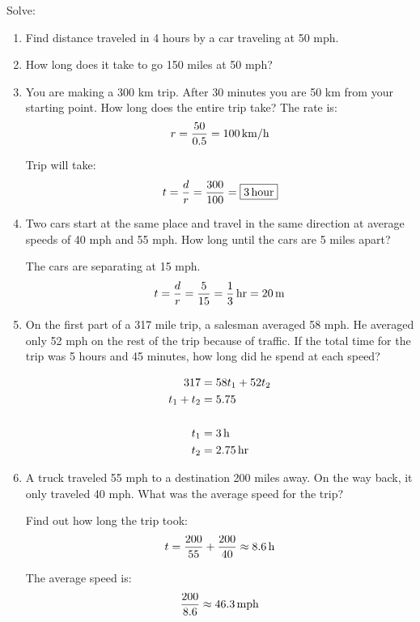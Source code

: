 \documentclass[letterpaper, landscape]{exam}
\begin{document}
  Solve:
  \begin{enumerate}
    \item Find distance traveled in 4 hours by a car traveling at 50 mph.

    \item How long does it take to go 150 miles at 50 mph?

    \item You are making a 300 km trip. After 30 minutes you are 50 km from your starting point. How long does the entire trip take?
      The rate is:
      \[
        r = \frac{50}{0.5} = \unit[100]{km/h}
      \]

      Trip will take:
      \[
        t = \frac{d}{r} = \frac{300}{100} = \boxed{ \unit[3]{hour} } 
      \]

    \item Two cars start at the same place and travel in the same direction at average speeds of 40
      mph and 55 mph. How long until the cars are 5 miles apart?

      The cars are separating at 15 mph.
      \[
        t = \frac{d}{r} = \frac{5}{15} = \unit[\frac{1}{3}]{hr} = \unit[20]{m}
      \]

    \item On the first part of a 317 mile trip, a salesman averaged 58 mph. He averaged only 52 mph
      on the rest of the trip because of traffic. If the total time for the trip was 5 hours and 45
      minutes, how long did he spend at each speed?

      \begin{align*}
        317       & = 58 t_1 + 52 t_2 \\
        t_1 + t_2 & = 5.75 \\
        \\
        t_1       & = \unit[3]{h} \\
        t_2       & = \unit[2.75]{hr}
      \end{align*}

    \item A truck traveled 55 mph to a destination 200 miles away. On the way back, it only traveled
      40 mph. What was the average speed for the trip?

      Find out how long the trip took:
      \[
        t = \frac{200}{55} + \frac{200}{40} \approx \unit[8.6]{h}
      \]

      The average speed is:
      \[
        \frac{200}{8.6} \approx \unit[46.3]{mph}
      \]



\end{enumerate}
\end{document}
